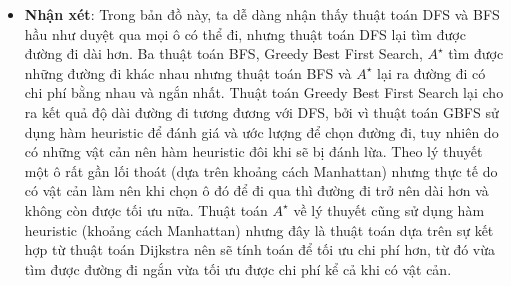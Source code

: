 \documentclass[11pt]{scrartcl} %
\begin{document}
\begin{itemize}
\begin{figure}[h]
\begin{tabular}{cc}
		\end{tabular}
	\end{figure}
	\begin{itemize}
		\item \textbf{Nhận xét}: Trong bản đồ này, ta dễ dàng nhận thấy thuật toán DFS và BFS hầu như duyệt qua mọi ô có thể đi, nhưng thuật toán DFS lại tìm được đường đi dài hơn. Ba thuật toán BFS, Greedy Best First Search, $A^{\star}$ tìm được những đường đi khác nhau nhưng thuật toán BFS và $A^{\star}$ lại ra đường đi có chi phí bằng nhau và ngắn nhất. Thuật toán Greedy Best First Search lại cho ra kết quả độ dài đường đi tương đương với DFS, bởi vì thuật toán GBFS sử dụng hàm heuristic để đánh giá và ước lượng để chọn đường đi, tuy nhiên do có những vật cản nên hàm heuristic đôi khi sẽ bị đánh lừa. Theo lý thuyết một ô rất gần lối thoát (dựa trên khoảng cách Manhattan) nhưng thực tế do có vật cản làm nên khi chọn ô đó để đi qua thì đường đi trở nên dài hơn và không còn được tối ưu nữa. Thuật toán $A^{\star}$ về lý thuyết cũng sử dụng hàm heuristic (khoảng cách Manhattan) nhưng đây là thuật toán dựa trên sự kết hợp từ thuật toán Dijkstra nên sẽ tính toán để tối ưu chi phí hơn, từ đó vừa tìm được đường đi ngắn vừa tối ưu được chi phí kể cả khi có vật cản.
	\end{itemize}


\end{itemize}
\end{document}
